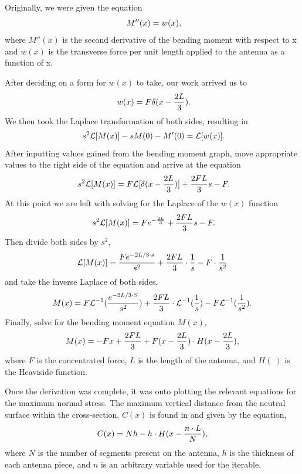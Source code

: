 \documentclass[12pt]{article}
\begin{document}
Originally, we were given the equation
\begin{equation}
    \centering
    \ M''(x) = w(x),
\end{equation}
where $M''(x)$ is the second derivative of the bending moment with respect to x and $w(x)$ is the transverse force per unit length applied to the antenna as a function of x.

After deciding on a form for $w(x)$  to take, our work arrived us to
\begin{equation}
    \centering
    \ w(x) = F\delta(x - \frac{2L}{3}).
\end{equation}
We then took the Laplace transformation of both sides, resulting in
\begin{equation}
    \centering
    \ s^2 \mathcal{L}[M(x)] - sM(0) - M'(0) = \mathcal{L}[w(x)].
\end{equation}
After inputting values gained from the bending moment graph, move appropriate values to the right side of the equation and arrive at the equation
\begin{equation}
    \centering
    \ s^2 \mathcal{L}[M(x)] = F\mathcal{L}[\delta(x - \frac{2L}{3})] + \frac{2FL}{3}{s} - F.
\end{equation}
At this point we are left with solving for the Laplace of the $w(x)$  function
\begin{equation}
    \centering
    \   s^2 \mathcal{L}[M(x)]=Fe^{-\frac{2L}{3}} + \frac{2FL}{3}{s} - F.
\end{equation}
Then divide both sides by $s^2$,
\begin{equation}
  \centering
  \mathcal{L}[M(x)] = \frac{Fe^{-2L/3 \cdot{s}}}{s^2} + \frac{2FL}{3} \cdot \frac{1}{s} - F \cdot \frac{1}{s^2}
  \end{equation}
 and take the inverse Laplace of both sides,
 \begin{equation}
  \centering
   M(x) = {F\mathcal{L}}^{-1}(\frac{e^{-2L/3 \cdot{S}}}{s^2}) + \frac{2FL}{3} \cdot \mathcal{L}^{-1}(\frac{1}{s})- F\mathcal{L}^{-1} (\frac{1}{s^2}).
  \end{equation}
 Finally, solve for the bending moment equation $M(x)$,
  \begin{equation}
  \centering
   M(x) = -Fx + \frac{2FL}{3} + F(x - \frac{2L}{3}) \cdot H(x - \frac{2L}{3}),
  \end{equation}
  where $F$ is the concentrated force, $L$ is the length of the antenna, and $H(\;)$ is the Heaviside function.
  
Once the derivation was complete, it was onto plotting the relevant equations for the maximum normal stress. The maximum vertical distance from the neutral surface within the cross-section, $C(x)$ is found in  and given by the equation,
\begin{equation}
  \centering
   C(x) = Nh-h \cdot{H(x - \frac{n \cdot{L}}{N}}),
  \end{equation}
where $N$ is the number of segments present on the antenna, $h$ is the thickness of each antenna piece, and $n$ is an arbitrary variable used for the iterable.
\end{document}
